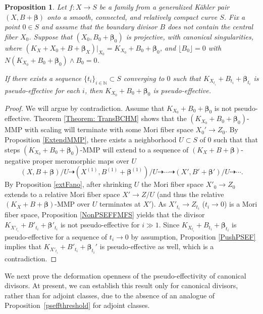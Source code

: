 \documentclass[12pt]{amsart}
\numberwithin{equation}{section}
\newtheorem{proposition}[theorem]{Proposition}
\theoremstyle{definition}
\theoremstyle{plain}
\newtheorem*{thm A*}{Theorem A}
\newtheorem*{thm B*}{Theorem B}
\newtheorem*{thm C*}{Theorem C}
\newtheorem*{thm D*}{Theorem D}
\theoremstyle{definition}
\renewcommand{\1}{\mathds{1}}
\newcommand{\bbeta}{\boldsymbol{\beta}}
\renewcommand{\>}{\rightarrow}
\begin{document}
\begin{proposition}\label{Def-Close-Pseff}
Let $f: X \to S$ be a family from a generalized K\"ahler pair $(X, B+  { \boldsymbol{\beta}})$ onto a smooth, connected, and relatively compact curve $S$. Fix a point $0\in S$ and assume that the boundary divisor $B$ does not contain the central fiber $X_0$. 
Suppose that $(X_0,B_0 + { \boldsymbol{\beta}}_0)$ is projective, with canonical singularities, where $(K_X+X_0+B+\bbeta _X)|_{X_0}=K_{X_0}+B_0+\bbeta _0$, and $\lfloor B_0 \rfloor = 0$ with $N(K_{X_0 }+B_0 + \bbeta_0)\wedge B_0  = 0$. 

If there exists a sequence $\{t_i\}_{i\in \mathbb N}\subset S$ converging to $0$ such that $K_{X_{t_i}}+B_{t_i}+\bbeta _{t_i}$  is pseudo-effective for each $i$, then $K_{X_0} + B_0+  { \bbeta}_0$ is pseudo-effective.
\end{proposition}

\begin{proof}
We will argue by contradiction. Assume that $K_{X_0}+B_0+ { \bbeta}_0$ is not pseudo-effective. Theorem \ref{Theorem: TransBCHM} shows that the $(K_{X_0}+ B_0 + { \bbeta}_0)$-MMP with scaling will terminate with some Mori fiber space $X_0' \to Z_0$. By Proposition \ref{ExtendMMP}, there exists a neighborhood $U \subset S$ of $0$ such that that steps $(K_{X_0}+ B_0 + \bbeta_0)$-MMP will extend to a sequence of $(K_X+B+\bbeta)$-negative proper meromorphic maps over $U$
$$(X,B+ \bbeta)/U \dashrightarrow (X^{(1)}, B^{(1)} + \bbeta^{(1)})/U \dashrightarrow \cdots \dashrightarrow (X', B' + \bbeta')/U \dashrightarrow \cdots.$$
By Proposition \ref{extFano}, after shrinking $U$ the Mori fiber space $X'_0 \to Z_0$ extends to a relative Mori fiber space $X'\to Z/U$ (and thus the relative $(K_{X}+ B + \bbeta)$-MMP over $U$ terminates at $X'$). 
As $X'_{t_i} \to Z_{t_i}$ ($t_i \to 0$) is a Mori fiber space, Proposition \ref{NonPSEFFMFS} yields that the divisor
$K_{X'_{t_i}} + B'_{t_i} + \bbeta'_{t_i}$
is not pseudo-effective for $i \gg 1$. 
Since $K_{X_{t_i}}+B_{t_i} + {\bbeta}_{t_i}$ is pseudo-effective for a sequence of $t_i \to 0$ by assumption, Proposition \ref{PushPSEF} implies that $K_{X'_{t_i}}+B'_{t_i} +  { \bbeta}_{t_i}'$ is pseudo-effective as well, which is a contradiction.
\end{proof}


We next prove the deformation openness of the pseudo-effectivity of canonical divisors. At present, we can establish this result only for canonical divisors, rather than for adjoint classes, due to the absence of an analogue of Proposition~\ref{pseffthreshold} for adjoint classes.
\end{document}
